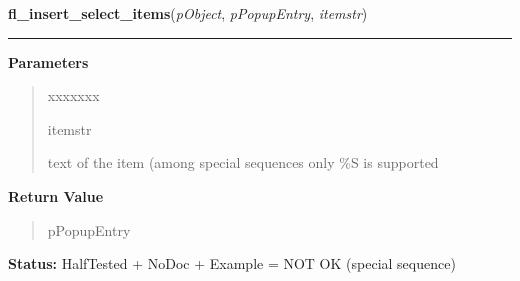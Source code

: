     \label{xformslib:library:fl_insert_select_items}

    \vspace{0.5ex}

\hspace{.8\funcindent}\begin{boxedminipage}{\funcwidth}

    \raggedright \textbf{fl\_insert\_select\_items}(\textit{pObject}, \textit{pPopupEntry}, \textit{itemstr})

    \vspace{-1.5ex}

    \rule{\textwidth}{0.5\fboxrule}
\setlength{\parskip}{2ex}
\setlength{\parskip}{1ex}
      \textbf{Parameters}
      \vspace{-1ex}

      \begin{quote}
        \begin{Ventry}{xxxxxxx}

          \item[itemstr]

          text of the item (among special sequences only \%S is supported

        \end{Ventry}

      \end{quote}

      \textbf{Return Value}
    \vspace{-1ex}

      \begin{quote}
      pPopupEntry

      \end{quote}

\textbf{Status:} HalfTested + NoDoc + Example = NOT OK (special sequence)



    \end{boxedminipage}

    \label{xformslib:library:fl_replace_select_item}

    \vspace{0.5ex}

